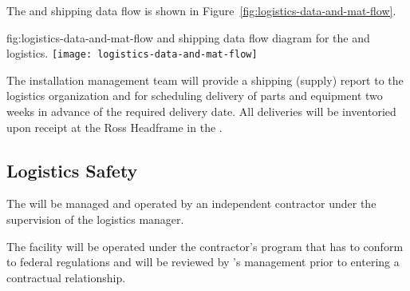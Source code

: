 The  and shipping data flow is shown in Figure~\ref{fig:logistics-data-and-mat-flow}.

 


\begin{dunefigure}{fig:logistics-data-and-mat-flow}
  { and shipping data flow diagram for the  and  logistics.}
 \texttt{[image: logistics-data-and-mat-flow]}
\end{dunefigure}

 
The  installation management team will provide a shipping (supply) report to the  logistics organization and  for scheduling delivery of parts and equipment two weeks in advance of the required delivery date. 
All %
deliveries will be inventoried upon receipt at the Ross Headframe in the . 




\subsection{Logistics Safety}
\label{sec:fdsp-tc-log-safety}

The  will be managed and operated by an independent contractor under the supervision of the %
 logistics manager. 

The facility will be operated under the contractor's  program that has to conform to federal regulations and will be reviewed by 's  management prior to entering a contractual relationship.

